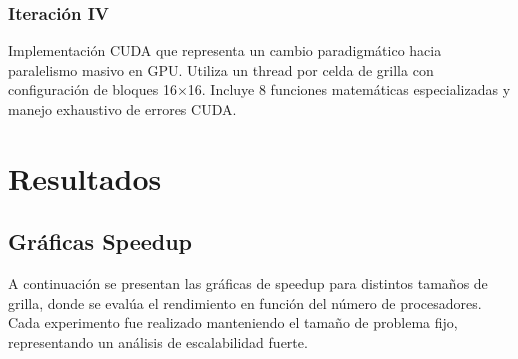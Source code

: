 \documentclass[12pt, A4]{article}
\begin{document}
\subsubsection{Iteración IV}
Implementación CUDA que representa un cambio paradigmático hacia paralelismo masivo en GPU. Utiliza un thread por celda de grilla con configuración de bloques 16×16. Incluye 8 funciones matemáticas especializadas y manejo exhaustivo de errores CUDA.

    
\section{Resultados}
\subsection{Gráficas Speedup}

A continuación se presentan las gráficas de speedup para distintos tamaños de grilla, donde se evalúa el rendimiento en función del número de procesadores. Cada experimento fue realizado manteniendo el tamaño de problema fijo, representando un análisis de escalabilidad fuerte.
\end{document}
